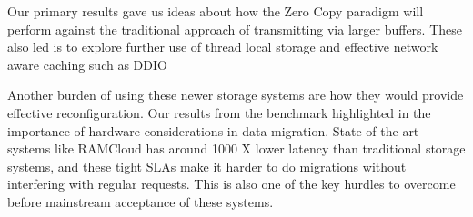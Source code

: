 Our primary results gave us ideas about how the Zero Copy paradigm will perform against
the traditional approach of transmitting via larger buffers. These also led is to 
explore further use of thread local storage and effective network aware caching such as DDIO~\cite{ddio}

Another burden of using these newer storage systems are how they would provide effective 
reconfiguration. Our results from the benchmark highlighted in the importance of 
hardware considerations in data migration. State of the art systems like RAMCloud has around 1000 X
lower latency than traditional storage systems, and these tight SLAs make it harder to do migrations
without interfering with regular requests. This is also one of the key hurdles 
to overcome before mainstream acceptance of these systems.


